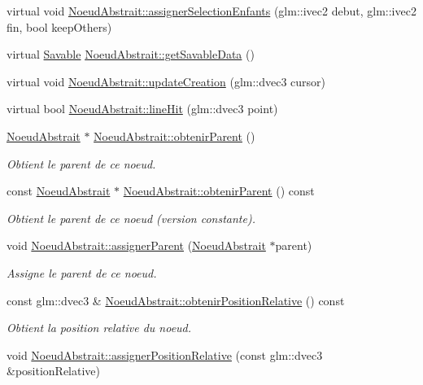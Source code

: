 \begin{DoxyCompactItemize}
\item 
virtual void \hyperlink{group__inf2990_ga7304995555625461f49b1e75dd81e888}{Noeud\-Abstrait\-::assigner\-Selection\-Enfants} (glm\-::ivec2 debut, glm\-::ivec2 fin, bool keep\-Others)
\item 
virtual \hyperlink{class_savable}{Savable} \hyperlink{group__inf2990_ga1729231ec41b3ba4d6668eba101ead44}{Noeud\-Abstrait\-::get\-Savable\-Data} ()
\item 
virtual void \hyperlink{group__inf2990_ga233fd4600812176c557bb94ea04da5c9}{Noeud\-Abstrait\-::update\-Creation} (glm\-::dvec3 cursor)
\item 
virtual bool \hyperlink{group__inf2990_gaf7c1f8526b0f7da001e9c3cb5e8e3540}{Noeud\-Abstrait\-::line\-Hit} (glm\-::dvec3 point)
\item 
\hyperlink{class_noeud_abstrait}{Noeud\-Abstrait} $\ast$ \hyperlink{group__inf2990_gaa2ac8c4cd02d88c312b92c65e07ed6d9}{Noeud\-Abstrait\-::obtenir\-Parent} ()
\begin{DoxyCompactList}\small\item\em Obtient le parent de ce noeud. \end{DoxyCompactList}\item 
const \hyperlink{class_noeud_abstrait}{Noeud\-Abstrait} $\ast$ \hyperlink{group__inf2990_gaf063d208bc4764b1fd2c4e76ec0469b9}{Noeud\-Abstrait\-::obtenir\-Parent} () const 
\begin{DoxyCompactList}\small\item\em Obtient le parent de ce noeud (version constante). \end{DoxyCompactList}\item 
void \hyperlink{group__inf2990_ga7787ab59ecc1e6119287459a7154f307}{Noeud\-Abstrait\-::assigner\-Parent} (\hyperlink{class_noeud_abstrait}{Noeud\-Abstrait} $\ast$parent)
\begin{DoxyCompactList}\small\item\em Assigne le parent de ce noeud. \end{DoxyCompactList}\item 
const glm\-::dvec3 \& \hyperlink{group__inf2990_ga62d73f67c3b33e2cb106630bd1736a58}{Noeud\-Abstrait\-::obtenir\-Position\-Relative} () const 
\begin{DoxyCompactList}\small\item\em Obtient la position relative du noeud. \end{DoxyCompactList}\item 
void \hyperlink{group__inf2990_ga11e12e42b05a5327c92cd7fd1b7e5a24}{Noeud\-Abstrait\-::assigner\-Position\-Relative} (const glm\-::dvec3 \&position\-Relative)

\end{DoxyCompactItemize}
